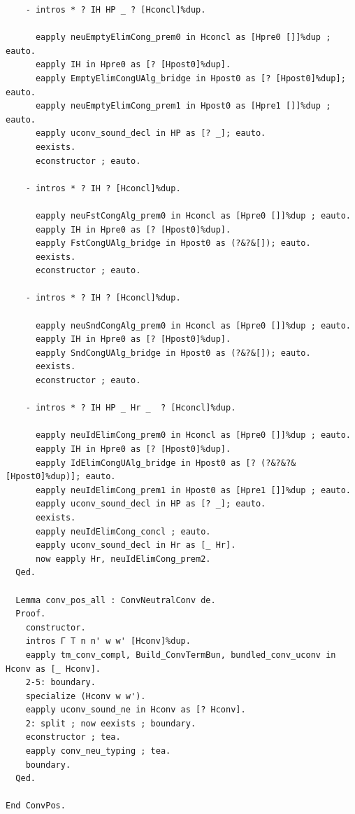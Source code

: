 \documentclass[10pt,a4paper]{amsart}
\begin{document}
\begin{lstlisting}
    - intros * ? IH HP _ ? [Hconcl]%dup.

      eapply neuEmptyElimCong_prem0 in Hconcl as [Hpre0 []]%dup ; eauto.
      eapply IH in Hpre0 as [? [Hpost0]%dup].
      eapply EmptyElimCongUAlg_bridge in Hpost0 as [? [Hpost0]%dup]; eauto.
      eapply neuEmptyElimCong_prem1 in Hpost0 as [Hpre1 []]%dup ; eauto.
      eapply uconv_sound_decl in HP as [? _]; eauto.
      eexists.
      econstructor ; eauto.

    - intros * ? IH ? [Hconcl]%dup.

      eapply neuFstCongAlg_prem0 in Hconcl as [Hpre0 []]%dup ; eauto.
      eapply IH in Hpre0 as [? [Hpost0]%dup].
      eapply FstCongUAlg_bridge in Hpost0 as (?&?&[]); eauto.
      eexists.
      econstructor ; eauto.

    - intros * ? IH ? [Hconcl]%dup.

      eapply neuSndCongAlg_prem0 in Hconcl as [Hpre0 []]%dup ; eauto.
      eapply IH in Hpre0 as [? [Hpost0]%dup].
      eapply SndCongUAlg_bridge in Hpost0 as (?&?&[]); eauto.
      eexists.
      econstructor ; eauto.

    - intros * ? IH HP _ Hr _  ? [Hconcl]%dup.

      eapply neuIdElimCong_prem0 in Hconcl as [Hpre0 []]%dup ; eauto.
      eapply IH in Hpre0 as [? [Hpost0]%dup].
      eapply IdElimCongUAlg_bridge in Hpost0 as [? (?&?&?&[Hpost0]%dup)]; eauto.
      eapply neuIdElimCong_prem1 in Hpost0 as [Hpre1 []]%dup ; eauto.
      eapply uconv_sound_decl in HP as [? _]; eauto.
      eexists.
      eapply neuIdElimCong_concl ; eauto.
      eapply uconv_sound_decl in Hr as [_ Hr].
      now eapply Hr, neuIdElimCong_prem2.
  Qed.

  Lemma conv_pos_all : ConvNeutralConv de.
  Proof.
    constructor.
    intros Γ T n n' w w' [Hconv]%dup.
    eapply tm_conv_compl, Build_ConvTermBun, bundled_conv_uconv in Hconv as [_ Hconv].
    2-5: boundary.
    specialize (Hconv w w').
    eapply uconv_sound_ne in Hconv as [? Hconv].
    2: split ; now eexists ; boundary.
    econstructor ; tea.
    eapply conv_neu_typing ; tea.
    boundary.
  Qed.

End ConvPos.
\end{lstlisting}
\end{document}
